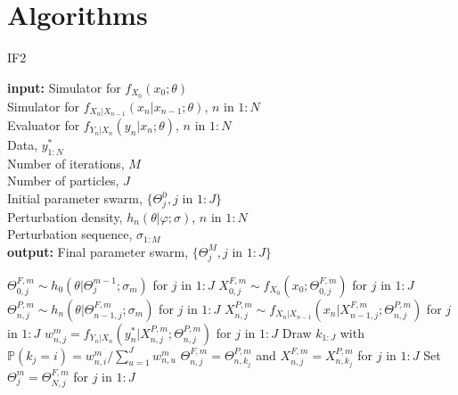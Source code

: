 \documentclass[11pt]{report}
\begin{document}
\newpage
\appendix
{}
\chapter{Algorithms}
\begin{algorithm}[ht]
\caption{IF2}
\textbf{input:} Simulator for $f_{X_0}(x_0;\theta)$\\
Simulator for $f_{X_n|X_{n-1}}(x_n|x_{n-1};\theta)$, $n$ in $1:N$\\
Evaluator for $f_{Y_n|X_n}(y_n|x_n;\theta)$, $n$ in $1:N$\\
Data, $y_{1:N}^*$\\
Number of iterations, $M$\\
Number of particles, $J$\\
Initial parameter swarm, $\{\Theta_j^0, j$ in $1:J\}$\\
Perturbation density, $h_n(\theta|\varphi;\sigma)$, $n$ in $1:N$\\
Perturbation sequence, $\sigma_{1:M}$\\
\textbf{output:} Final parameter swarm, $\{\Theta_j^M, j$ in $1:J\}$

\begin{algorithmic}[1]
    \State $\Theta_{0,j}^{F,m} \sim h_0(\theta|\Theta_j^{m-1};\sigma_m)$ for $j$ in $1:J$
    \State $X_{0,j}^{F,m} \sim f_{X_0}(x_0; \Theta_{0,j}^{F,m})$ for $j$ in $1:J$
        \State $\Theta_{n,j}^{P,m} \sim h_n(\theta|\Theta_{n-1,j}^{F,m};\sigma_m)$ for $j$ in $1:J$
        \State $X_{n,j}^{P,m} \sim f_{X_n|X_{n-1}}(x_n|X_{n-1,j}^{F,m}; \Theta_{n,j}^{P,m})$ for $j$ in $1:J$
        \State $w_{n,j}^m = f_{Y_n|X_n}(y_n^*|X_{n,j}^{P,m};\Theta_{n,j}^{P,m})$ for $j$ in $1:J$
        \State Draw $k_{1:J}$ with $\mathbb{P}(k_j = i) = w_{n,i}^m / \sum_{u=1}^J w_{n,u}^m$
        \State $\Theta_{n,j}^{F,m} = \Theta_{n,k_j}^{P,m}$ and $X_{n,j}^{F,m} = X_{n,k_j}^{P,m}$ for $j$ in $1:J$
    \EndFor
    \State Set $\Theta_j^m = \Theta_{N,j}^{F,m}$ for $j$ in $1:J$
\EndFor
\end{algorithmic}
\end{algorithm}

\end{document}
